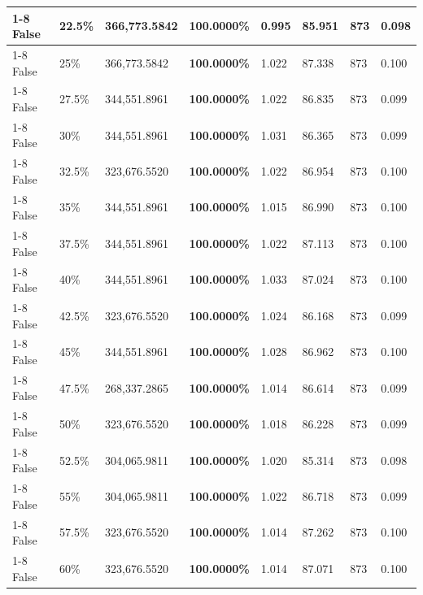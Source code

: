 \begin{table}[H]
{\begin{tabular}{lllrllll}
\cline{1-8} \cline{2-8}
False & 22.5\% & 366,773.5842 & \bfseries \color{red} 100.0000\% & 0.995 & 85.951 & 873 & 0.098 \\
\cline{1-8} \cline{2-8}
False & 25\% & 366,773.5842 & \bfseries \color{red} 100.0000\% & 1.022 & 87.338 & 873 & 0.100 \\
\cline{1-8} \cline{2-8}
False & 27.5\% & 344,551.8961 & \bfseries \color{red} 100.0000\% & 1.022 & 86.835 & 873 & 0.099 \\
\cline{1-8} \cline{2-8}
False & 30\% & 344,551.8961 & \bfseries \color{red} 100.0000\% & 1.031 & 86.365 & 873 & 0.099 \\
\cline{1-8} \cline{2-8}
False & 32.5\% & 323,676.5520 & \bfseries \color{red} 100.0000\% & 1.022 & 86.954 & 873 & 0.100 \\
\cline{1-8} \cline{2-8}
False & 35\% & 344,551.8961 & \bfseries \color{red} 100.0000\% & 1.015 & 86.990 & 873 & 0.100 \\
\cline{1-8} \cline{2-8}
False & 37.5\% & 344,551.8961 & \bfseries \color{red} 100.0000\% & 1.022 & 87.113 & 873 & 0.100 \\
\cline{1-8} \cline{2-8}
False & 40\% & 344,551.8961 & \bfseries \color{red} 100.0000\% & 1.033 & 87.024 & 873 & 0.100 \\
\cline{1-8} \cline{2-8}
False & 42.5\% & 323,676.5520 & \bfseries \color{red} 100.0000\% & 1.024 & 86.168 & 873 & 0.099 \\
\cline{1-8} \cline{2-8}
False & 45\% & 344,551.8961 & \bfseries \color{red} 100.0000\% & 1.028 & 86.962 & 873 & 0.100 \\
\cline{1-8} \cline{2-8}
False & 47.5\% & \color{red} 268,337.2865 & \bfseries \color{red} 100.0000\% & 1.014 & 86.614 & 873 & 0.099 \\
\cline{1-8} \cline{2-8}
False & 50\% & 323,676.5520 & \bfseries \color{red} 100.0000\% & 1.018 & 86.228 & 873 & 0.099 \\
\cline{1-8} \cline{2-8}
False & 52.5\% & 304,065.9811 & \bfseries \color{red} 100.0000\% & 1.020 & 85.314 & 873 & 0.098 \\
\cline{1-8} \cline{2-8}
False & 55\% & 304,065.9811 & \bfseries \color{red} 100.0000\% & 1.022 & 86.718 & 873 & 0.099 \\
\cline{1-8} \cline{2-8}
False & 57.5\% & 323,676.5520 & \bfseries \color{red} 100.0000\% & 1.014 & 87.262 & 873 & 0.100 \\
\cline{1-8} \cline{2-8}
False & 60\% & 323,676.5520 & \bfseries \color{red} 100.0000\% & 1.014 & 87.071 & 873 & 0.100 \\

\end{tabular}}
\end{table}
